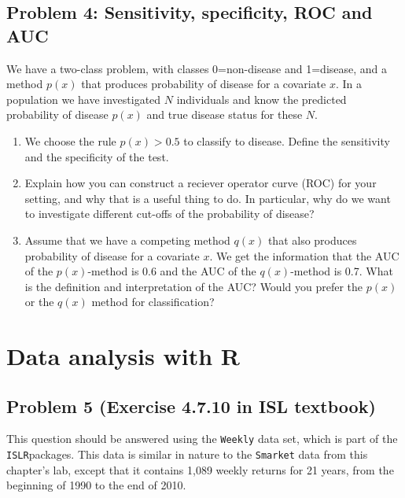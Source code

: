 \documentclass[]{article}
\providecommand{\tightlist}{%
  \setlength{\itemsep}{0pt}\setlength{\parskip}{0pt}}
\begin{document}
\subsection{Problem 4: Sensitivity, specificity, ROC and
AUC}\label{problem-4-sensitivity-specificity-roc-and-auc}

We have a two-class problem, with classes 0=non-disease and 1=disease,
and a method \(p(x)\) that produces probability of disease for a
covariate \(x\). In a population we have investigated \(N\) individuals
and know the predicted probability of disease \(p(x)\) and true disease
status for these \(N\).

\begin{enumerate}
\def\labelenumi{\alph{enumi}.}
\tightlist
\item
  We choose the rule \(p(x)>0.5\) to classify to disease. Define the
  sensitivity and the specificity of the test.
\item
  Explain how you can construct a reciever operator curve (ROC) for your
  setting, and why that is a useful thing to do. In particular, why do
  we want to investigate different cut-offs of the probability of
  disease?
\item
  Assume that we have a competing method \(q(x)\) that also produces
  probability of disease for a covariate \(x\). We get the information
  that the AUC of the \(p(x)\)-method is 0.6 and the AUC of the
  \(q(x)\)-method is 0.7. What is the definition and interpretation of
  the AUC? Would you prefer the \(p(x)\) or the \(q(x)\) method for
  classification?
\end{enumerate}

\section{Data analysis with R}\label{data-analysis-with-r}

\subsection{Problem 5 (Exercise 4.7.10 in ISL
textbook)}\label{problem-5-exercise-4.7.10-in-isl-textbook}

This question should be answered using the \texttt{Weekly} data set,
which is part of the \texttt{ISLR}packages. This data is similar in
nature to the \texttt{Smarket} data from this chapter's lab, except that
it contains 1,089 weekly returns for 21 years, from the beginning of
1990 to the end of 2010.
\end{document}
